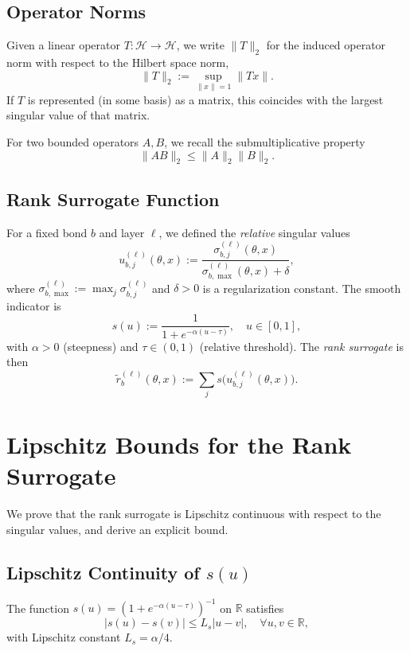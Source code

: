 \documentclass[11pt]{article}
\begin{document}
\subsection{Operator Norms}

Given a linear operator $T: \mathcal{H} \to \mathcal{H}$, we write $\|T\|_{2}$ for the induced operator norm with respect to the Hilbert space norm,
\[
\|T\|_{2} 
:= \sup_{\|x\|=1} \|T x\|.
\]
If $T$ is represented (in some basis) as a matrix, this coincides with the largest singular value of that matrix.

For two bounded operators $A,B$, we recall the submultiplicative property
\[
\|AB\|_2 \le \|A\|_2 \|B\|_2.
\]

\subsection{Rank Surrogate Function}

For a fixed bond $b$ and layer $\ell$, we defined the \emph{relative} singular values
\[
u_{b,j}^{(\ell)}(\theta,x)
:= \frac{\sigma_{b,j}^{(\ell)}(\theta,x)}{\sigma_{b,\max}^{(\ell)}(\theta,x) + \delta},
\]
where $\sigma_{b,\max}^{(\ell)} := \max_j \sigma_{b,j}^{(\ell)}$ and $\delta > 0$ is a regularization constant. The smooth indicator is
\[
s(u) := \frac{1}{1 + e^{-\alpha (u - \tau)}}, \quad u\in[0,1],
\]
with $\alpha>0$ (steepness) and $\tau\in(0,1)$ (relative threshold). The \emph{rank surrogate} is then
\[
\tilde{r}_b^{(\ell)}(\theta,x)
:= \sum_j s\big(u_{b,j}^{(\ell)}(\theta,x)\big).
\]


\section{Lipschitz Bounds for the Rank Surrogate}

We prove that the rank surrogate is Lipschitz continuous with respect to the singular values, and derive an explicit bound.

\subsection{Lipschitz Continuity of $s(u)$}

\begin{lemma}
\label{lem:s-lipschitz}
The function $s(u) = (1 + e^{-\alpha(u-\tau)})^{-1}$ on $\mathbb{R}$ satisfies
\[
\big|s(u) - s(v)\big| \le L_s |u-v|, \quad \forall u,v\in \mathbb{R},
\]
with Lipschitz constant $L_s = \alpha/4$.
\end{lemma}
\end{document}
